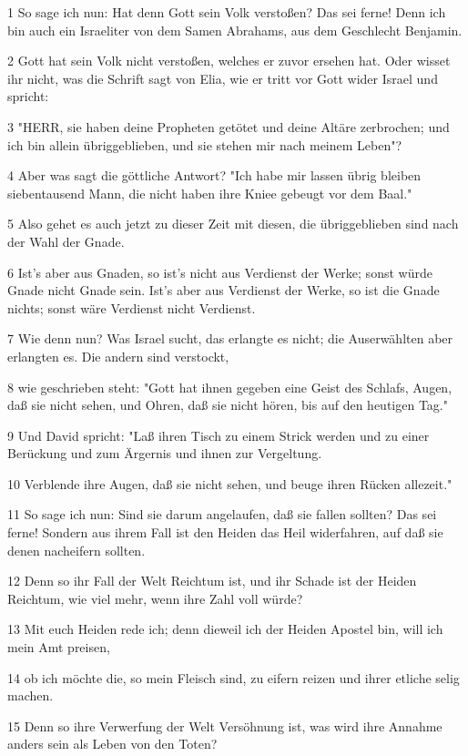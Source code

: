 \par 1 So sage ich nun: Hat denn Gott sein Volk verstoßen? Das sei ferne! Denn ich bin auch ein Israeliter von dem Samen Abrahams, aus dem Geschlecht Benjamin.
\par 2 Gott hat sein Volk nicht verstoßen, welches er zuvor ersehen hat. Oder wisset ihr nicht, was die Schrift sagt von Elia, wie er tritt vor Gott wider Israel und spricht:
\par 3 "HERR, sie haben deine Propheten getötet und deine Altäre zerbrochen; und ich bin allein übriggeblieben, und sie stehen mir nach meinem Leben"?
\par 4 Aber was sagt die göttliche Antwort? "Ich habe mir lassen übrig bleiben siebentausend Mann, die nicht haben ihre Kniee gebeugt vor dem Baal."
\par 5 Also gehet es auch jetzt zu dieser Zeit mit diesen, die übriggeblieben sind nach der Wahl der Gnade.
\par 6 Ist's aber aus Gnaden, so ist's nicht aus Verdienst der Werke; sonst würde Gnade nicht Gnade sein. Ist's aber aus Verdienst der Werke, so ist die Gnade nichts; sonst wäre Verdienst nicht Verdienst.
\par 7 Wie denn nun? Was Israel sucht, das erlangte es nicht; die Auserwählten aber erlangten es. Die andern sind verstockt,
\par 8 wie geschrieben steht: "Gott hat ihnen gegeben eine Geist des Schlafs, Augen, daß sie nicht sehen, und Ohren, daß sie nicht hören, bis auf den heutigen Tag."
\par 9 Und David spricht: "Laß ihren Tisch zu einem Strick werden und zu einer Berückung und zum Ärgernis und ihnen zur Vergeltung.
\par 10 Verblende ihre Augen, daß sie nicht sehen, und beuge ihren Rücken allezeit."
\par 11 So sage ich nun: Sind sie darum angelaufen, daß sie fallen sollten? Das sei ferne! Sondern aus ihrem Fall ist den Heiden das Heil widerfahren, auf daß sie denen nacheifern sollten.
\par 12 Denn so ihr Fall der Welt Reichtum ist, und ihr Schade ist der Heiden Reichtum, wie viel mehr, wenn ihre Zahl voll würde?
\par 13 Mit euch Heiden rede ich; denn dieweil ich der Heiden Apostel bin, will ich mein Amt preisen,
\par 14 ob ich möchte die, so mein Fleisch sind, zu eifern reizen und ihrer etliche selig machen.
\par 15 Denn so ihre Verwerfung der Welt Versöhnung ist, was wird ihre Annahme anders sein als Leben von den Toten?
